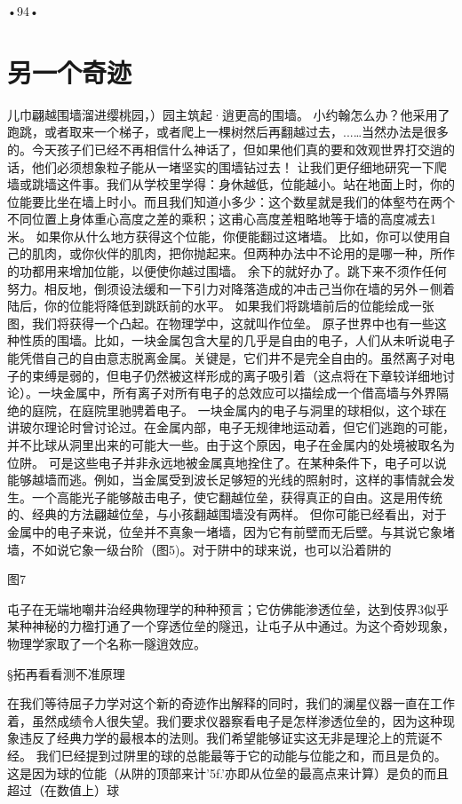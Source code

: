 •94•
  
\section{另一个奇迹}

儿巾翩越围墙溜进缨桃园，）园主筑起·逍更高的围墙。
小约翰怎么办？他采用了跑跳，或者取来一个梯子，或者爬上一棵树然后再翻越过去，...…当然办法是很多的。今天孩子们已经不再相信什么神话了，但如果他们真的要和效观世界打交逍的话，他们必须想象粒子能从一堵坚实的围墙钻过去！
让我们更仔细地研究一下爬墙或跳墙这件事。我们从学校里学得：身休越低，位能越小。站在地面上时，你的位能要比坐在墙上时小。而且我们知道小多少：这个数星就是我们的体壑芍在两个不同位置上身体重心高度之差的乘积；这甫心高度差粗略地等于墙的高度减去1米。
如果你从什么地方获得这个位能，你便能翻过这堵墙。
比如，你可以使用自己的肌肉，或你伙伴的肌肉，把你抛起来。但两种办法中不论用的是哪一种，所作的功都用来增加位能，以便使你越过围墙。
余下的就好办了。跳下来不须作任何努力。相反地，倒须设法缓和一下引力对降落造成的冲击己当你在墙的另外－侧着陆后，你的位能将降低到跳跃前的水平。
如果我们将跳墙前后的位能绘成一张图，我们将获得一个凸起。在物理学中，这就叫作位垒。
原子世界中也有一些这种性质的围墙。比如，一块金属包含大星的几乎是自由的电子，人们从未听说电子能凭借自己的自由意志脱离金属。关键是，它们井不是完全自由的。虽然离子对电子的束缚是弱的，但电子仍然被这样形成的离子吸引着（这点将在下章较详细地讨论）。一块金属中，所有离子对所有电子的总效应可以描绘成一个借高墙与外界隔绝的庭院，在庭院里驰骋着电子。
一块金属内的电子与洞里的球相似，这个球在讲玻尔理论时曾讨论过。在金属内部，电子无规律地运动着，但它们逃跑的可能，并不比球从洞里出来的可能大一些。由于这个原因，电子在金属内的处境被取名为位阱。
可是这些电子并非永远地被金属真地拴住了。在某种条件下，电子可以说能够越墙而逃。例如，当金属受到波长足够短的光线的照射时，这样的事情就会发生。一个高能光子能够敲击电子，使它翻越位垒，获得真正的自由。这是用传统的、经典的方法翩越位垒，与小孩翻越围墙没有两样。
但你可能已经看出，对于金属中的电子来说，位垒并不真象一堵墙，因为它有前壁而无后壁。与其说它象堵墙，不如说它象一级台阶（图5)。对于阱中的球来说，也可以沿着阱的



图7

屯子在无端地嘲井治经典物理学的种种预言；它仿佛能渗透位垒，达到伎界3似乎某种神秘的力楹打通了一个穿透位垒的隧迅，让屯子从中通过。为这个奇妙现象，物理学家取了一个名称一隧逍效应。

§拓再看看测不准原理

在我们等待屈子力学对这个新的奇迹作出解释的同时，我们的澜星仪器一直在工作着，虽然成绩令人很失望。我们要求仪器察看电子是怎样渗透位垒的，因为这种现象违反了经典力学的最根本的法则。我们希望能够证实这无非是理沦上的荒诞不经。
我们巳经提到过阱里的球的总能最等于它的动能与位能之和，而且是负的。这是因为球的位能（从阱的顶部来计'5f.'亦即从位垒的最高点来计算）是负的而且超过（在数值上）球

